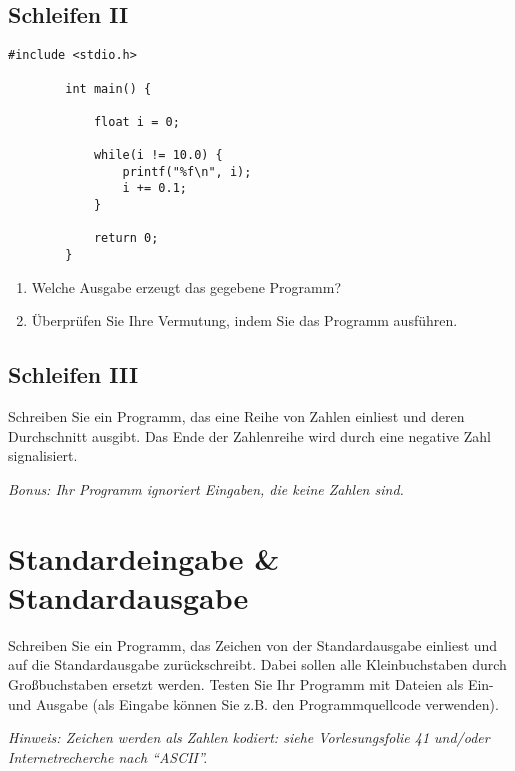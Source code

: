 \documentclass[]{article}
\begin{document}
	\subsection{Schleifen II}
	
	\begin{lstlisting}[gobble=4]
		#include <stdio.h>
		
		int main() {
			
			float i = 0;
			
			while(i != 10.0) {
				printf("%f\n", i);
				i += 0.1;
			}
			
			return 0;
		}
	\end{lstlisting}
	
	\begin{enumerate}
		\item Welche Ausgabe erzeugt das gegebene Programm?
		\item Überprüfen Sie Ihre Vermutung, indem Sie das Programm ausführen.
	\end{enumerate}
	
	\subsection{Schleifen III}
	
	Schreiben Sie ein Programm, das eine Reihe von Zahlen einliest und deren Durchschnitt ausgibt.
	Das Ende der Zahlenreihe wird durch eine negative Zahl signalisiert.
	
	\textit{Bonus: Ihr Programm ignoriert Eingaben, die keine Zahlen sind.}
	
	\section{Standardeingabe \& Standardausgabe}
	
	Schreiben Sie ein Programm, das Zeichen von der Standardausgabe einliest und auf die Standardausgabe zurückschreibt.
	Dabei sollen alle Kleinbuchstaben durch Großbuchstaben ersetzt werden.
	Testen Sie Ihr Programm mit Dateien als Ein- und Ausgabe (als Eingabe können Sie z.B. den Programmquellcode verwenden).
	
	\textit{Hinweis: Zeichen werden als Zahlen kodiert: siehe Vorlesungsfolie 41 und/oder Internetrecherche nach \enquote{ASCII}.}

	
\end{document}
